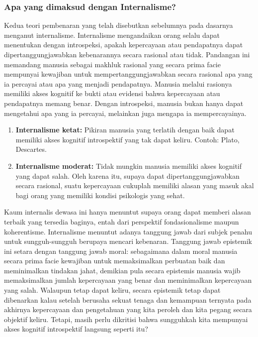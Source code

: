 \documentclass[11pt,twoside,a5paper,openany]{memoir}
\def\tightlist{}
\begin{document}
\hypertarget{apa-yang-dimaksud-dengan-internalisme}{%
\subsubsection{Apa yang dimaksud dengan
Internalisme?}\label{apa-yang-dimaksud-dengan-internalisme}}

Kedua teori pembenaran yang telah disebutkan sebelumnya pada dasarnya
menganut internalisme. Internalisme mengandaikan orang selalu dapat
menentukan dengan introspeksi, apakah kepercayaan atau pendapatnya dapat
dipertanggungjawabkan kebenarannya secara rasional atau tidak. Pandangan
ini memandang manusia sebagai makhluk rasional yang secara prima facie
mempunyai kewajiban untuk mempertanggungjawabkan secara rasional apa
yang ia percayai atau apa yang menjadi pendapatnya. Manusia melalui
rasionya memiliki akses kognitif ke bukti atau evidensi bahwa
kepercayaan atau pendapatnya memang benar. Dengan introspeksi, manusia
bukan hanya dapat mengetahui apa yang ia percayai, melainkan juga
mengapa ia mempercayainya.

\begin{enumerate}
\def\labelenumi{\arabic{enumi}.}
\tightlist
\item
  \textbf{Internalisme ketat:} Pikiran manusia yang terlatih dengan baik
  dapat memiliki akses kognitif introspektif yang tak dapat keliru.
  Contoh: Plato, Descartes.
\item
  \textbf{Internalisme moderat:} Tidak mungkin manusia memiliki akses
  kognitif yang dapat salah. Oleh karena itu, supaya dapat
  dipertanggungjawabkan secara rasional, suatu kepercayaan cukuplah
  memiliki alasan yang masuk akal bagi orang yang memiliki kondisi
  psikologis yang sehat.
\end{enumerate}

Kaum internalis dewasa ini hanya menuntut supaya orang dapat memberi
alasan terbaik yang tersedia baginya, entah dari perspektif
fondasionalisme maupun koherentisme. Internalisme menuntut adanya
tanggung jawab dari subjek penahu untuk sungguh-sungguh berupaya mencari
kebenaran. Tanggung jawab epistemik ini setara dengan tanggung jawab
moral: sebagaimana dalam moral manusia secara prima facie kewajiban
untuk memaksimalkan perbuatan baik dan meminimalkan tindakan jahat,
demikian pula secara epistemis manusia wajib memaksimalkan jumlah
kepercayaan yang benar dan meminimalkan kepercayaan yang salah. Walaupun
tetap dapat keliru, secara epistemik tetap dapat dibenarkan kalau
setelah berusaha sekuat tenaga dan kemampuan ternyata pada akhirnya
kepercayaan dan pengetahuan yang kita peroleh dan kita pegang secara
objektif keliru. Tetapi, masih perlu dikritisi bahwa sungguhkah kita
mempunyai akses kognitif introspektif langsung seperti itu?
\end{document}
